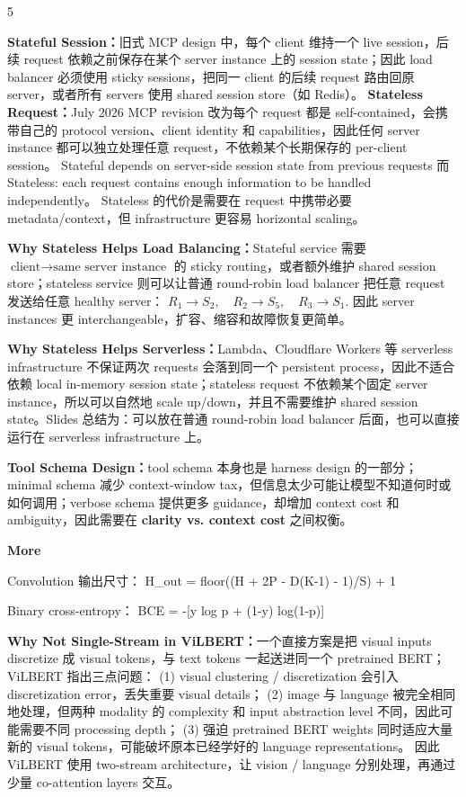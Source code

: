 \documentclass[a4paper, landscape]{article}
\newcommand{\topic}[1]{\par\medskip\textbf{#1}\par}
\renewcommand{\topic}[1]{%
  \par\smallskip\noindent
  \colorbox{highlightcolor}{%
    \parbox{\dimexpr\columnwidth-2\fboxsep\relax}{%
      \textbf{#1}%
    }%
  }%
  \par
}
\begin{document}
\begin{multicols}{5}
\par \textbf{Stateful Session：}旧式 MCP design 中，每个 client 维持一个 live session，后续 request 依赖之前保存在某个 server instance 上的 session state；因此 load balancer 必须使用 sticky sessions，把同一 client 的后续 request 路由回原 server，或者所有 servers 使用 shared session store（如 Redis）。
\textbf{Stateless Request：}July 2026 MCP revision 改为每个 request 都是 self-contained，会携带自己的 protocol version、client identity 和 capabilities，因此任何 server instance 都可以独立处理任意 request，不依赖某个长期保存的 per-client session。
Stateful depends on server-side session state from previous requests
而
Stateless: each request contains enough information to be handled independently。
Stateless 的代价是需要在 request 中携带必要 metadata/context，但 infrastructure 更容易 horizontal scaling。

\par \textbf{Why Stateless Helps Load Balancing：}Stateful service 需要
\(
\text{client}\rightarrow\text{same server instance}
\)
的 sticky routing，或者额外维护 shared session store；stateless service 则可以让普通 round-robin load balancer 把任意 request 发送给任意 healthy server：
\(
R_1\rightarrow S_2,\quad
R_2\rightarrow S_5,\quad
R_3\rightarrow S_1.
\)
因此 server instances 更 interchangeable，扩容、缩容和故障恢复更简单。

\par \textbf{Why Stateless Helps Serverless：}Lambda、Cloudflare Workers 等 serverless infrastructure 不保证两次 requests 会落到同一个 persistent process，因此不适合依赖 local in-memory session state；stateless request 不依赖某个固定 server instance，所以可以自然地 scale up/down，并且不需要维护 shared session state。Slides 总结为：可以放在普通 round-robin load balancer 后面，也可以直接运行在 serverless infrastructure 上。

\par \textbf{Tool Schema Design：}tool schema 本身也是 harness design 的一部分；minimal schema 减少 context-window tax，但信息太少可能让模型不知道何时或如何调用；verbose schema 提供更多 guidance，却增加 context cost 和 ambiguity，因此需要在 \textbf{clarity vs. context cost} 之间权衡。

\topic{More}
Convolution 输出尺寸：
H\_out = floor((H + 2P - D(K-1) - 1)/S) + 1

Binary cross-entropy：
BCE = -[y log p + (1-y) log(1-p)]

\par \textbf{Why Not Single-Stream in ViLBERT：}一个直接方案是把 visual inputs discretize 成 visual tokens，与 text tokens 一起送进同一个 pretrained BERT；ViLBERT 指出三点问题：
(1) visual clustering / discretization 会引入 discretization error，丢失重要 visual details；
(2) image 与 language 被完全相同地处理，但两种 modality 的 complexity 和 input abstraction level 不同，因此可能需要不同 processing depth；
(3) 强迫 pretrained BERT weights 同时适应大量新的 visual tokens，可能破坏原本已经学好的 language representations。
因此 ViLBERT 使用 two-stream architecture，让 vision / language 分别处理，再通过少量 co-attention layers 交互。


\end{multicols}
\end{document}
